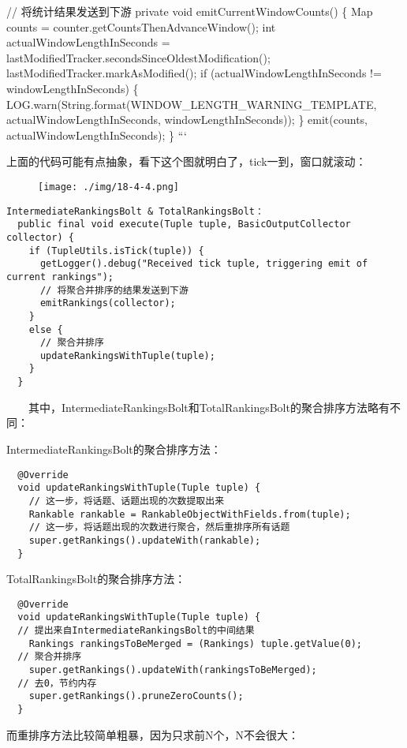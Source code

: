// 将统计结果发送到下游 private void emitCurrentWindowCounts() \{ Map
counts = counter.getCountsThenAdvanceWindow(); int
actualWindowLengthInSeconds =
lastModifiedTracker.secondsSinceOldestModification();
lastModifiedTracker.markAsModified(); if (actualWindowLengthInSeconds !=
windowLengthInSeconds) \{
LOG.warn(String.format(WINDOW\_LENGTH\_WARNING\_TEMPLATE,
actualWindowLengthInSeconds, windowLengthInSeconds)); \} emit(counts,
actualWindowLengthInSeconds); \} ```

上面的代码可能有点抽象，看下这个图就明白了，tick一到，窗口就滚动：

\begin{figure}
\centering
\texttt{[image: ./img/18-4-4.png]}
\caption{}
\end{figure}

\begin{verbatim}
IntermediateRankingsBolt & TotalRankingsBolt：
  public final void execute(Tuple tuple, BasicOutputCollector collector) {
    if (TupleUtils.isTick(tuple)) {
      getLogger().debug("Received tick tuple, triggering emit of current rankings");
      // 将聚合并排序的结果发送到下游
      emitRankings(collector);
    }
    else {
      // 聚合并排序
      updateRankingsWithTuple(tuple);
    }
  }
\end{verbatim}

  其中，IntermediateRankingsBolt和TotalRankingsBolt的聚合排序方法略有不同：

IntermediateRankingsBolt的聚合排序方法：

\begin{verbatim}
  @Override
  void updateRankingsWithTuple(Tuple tuple) {
    // 这一步，将话题、话题出现的次数提取出来
    Rankable rankable = RankableObjectWithFields.from(tuple);
    // 这一步，将话题出现的次数进行聚合，然后重排序所有话题
    super.getRankings().updateWith(rankable);
  }
\end{verbatim}

TotalRankingsBolt的聚合排序方法：

\begin{verbatim}
  @Override
  void updateRankingsWithTuple(Tuple tuple) {
  // 提出来自IntermediateRankingsBolt的中间结果
    Rankings rankingsToBeMerged = (Rankings) tuple.getValue(0);
  // 聚合并排序
    super.getRankings().updateWith(rankingsToBeMerged);
  // 去0，节约内存
    super.getRankings().pruneZeroCounts();
  }
\end{verbatim}

而重排序方法比较简单粗暴，因为只求前N个，N不会很大：

